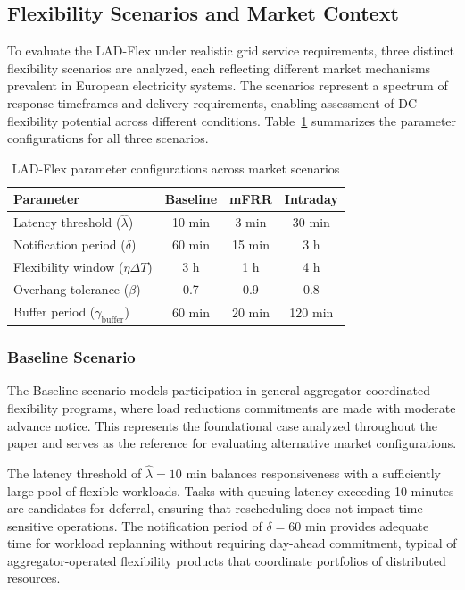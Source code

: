 \documentclass[preprint,12pt]{elsarticle}
\begin{document}
\subsection{Flexibility Scenarios and Market Context}\label{Case_study_scenarios}

To evaluate the LAD-Flex under realistic grid service requirements, three distinct flexibility scenarios are analyzed, each reflecting different market mechanisms prevalent in European electricity systems. The scenarios represent a spectrum of response timeframes and delivery requirements, enabling assessment of DC flexibility potential across different conditions. Table~\ref{tab:scenario_parameters} summarizes the parameter configurations for all three scenarios.

\begin{table}[htbp]
\centering
\caption{LAD-Flex parameter configurations across market scenarios}
\label{tab:scenario_parameters}
\begin{tabular}{lccc}
\toprule
\textbf{Parameter} & \textbf{Baseline} & \textbf{mFRR} & \textbf{Intraday} \\
\midrule
Latency threshold ($\hat{\lambda}$) & 10 min & 3 min & 30 min \\
Notification period ($\delta$) & 60 min & 15 min & 3 h \\
Flexibility window ($\eta\Delta T$) & 3 h & 1 h & 4 h \\
Overhang tolerance ($\beta$) & 0.7 & 0.9 & 0.8 \\
Buffer period ($\gamma_{\text{buffer}}$) & 60 min & 20 min & 120 min \\
\bottomrule
\end{tabular}
\end{table}

\subsubsection{Baseline Scenario}
The Baseline scenario models participation in general aggregator-coordinated flexibility programs, where load reductions commitments are made with moderate advance notice. This represents the foundational case analyzed throughout the paper and serves as the reference for evaluating alternative market configurations.

The latency threshold of $\hat{\lambda} = 10$ min balances responsiveness with a sufficiently large pool of flexible workloads. Tasks with queuing latency exceeding 10 minutes are candidates for deferral, ensuring that rescheduling does not impact time-sensitive operations. The notification period of $\delta = 60$ min provides adequate time for workload replanning without requiring day-ahead commitment, typical of aggregator-operated flexibility products that coordinate portfolios of distributed resources.
\end{document}
